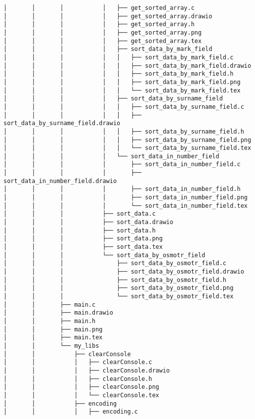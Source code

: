 \begin{verbatim}
│       │       │           │   ├── get_sorted_array.c
│       │       │           │   ├── get_sorted_array.drawio
│       │       │           │   ├── get_sorted_array.h
│       │       │           │   ├── get_sorted_array.png
│       │       │           │   ├── get_sorted_array.tex
│       │       │           │   ├── sort_data_by_mark_field
│       │       │           │   │   ├── sort_data_by_mark_field.c
│       │       │           │   │   ├── sort_data_by_mark_field.drawio
│       │       │           │   │   ├── sort_data_by_mark_field.h
│       │       │           │   │   ├── sort_data_by_mark_field.png
│       │       │           │   │   └── sort_data_by_mark_field.tex
│       │       │           │   ├── sort_data_by_surname_field
│       │       │           │   │   ├── sort_data_by_surname_field.c
│       │       │           │   │   ├── sort_data_by_surname_field.drawio
│       │       │           │   │   ├── sort_data_by_surname_field.h
│       │       │           │   │   ├── sort_data_by_surname_field.png
│       │       │           │   │   └── sort_data_by_surname_field.tex
│       │       │           │   └── sort_data_in_number_field
│       │       │           │       ├── sort_data_in_number_field.c
│       │       │           │       ├── sort_data_in_number_field.drawio
│       │       │           │       ├── sort_data_in_number_field.h
│       │       │           │       ├── sort_data_in_number_field.png
│       │       │           │       └── sort_data_in_number_field.tex
│       │       │           ├── sort_data.c
│       │       │           ├── sort_data.drawio
│       │       │           ├── sort_data.h
│       │       │           ├── sort_data.png
│       │       │           ├── sort_data.tex
│       │       │           └── sort_data_by_osmotr_field
│       │       │               ├── sort_data_by_osmotr_field.c
│       │       │               ├── sort_data_by_osmotr_field.drawio
│       │       │               ├── sort_data_by_osmotr_field.h
│       │       │               ├── sort_data_by_osmotr_field.png
│       │       │               └── sort_data_by_osmotr_field.tex
│       │       ├── main.c
│       │       ├── main.drawio
│       │       ├── main.h
│       │       ├── main.png
│       │       ├── main.tex
│       │       └── my_libs
│       │           ├── clearConsole
│       │           │   ├── clearConsole.c
│       │           │   ├── clearConsole.drawio
│       │           │   ├── clearConsole.h
│       │           │   ├── clearConsole.png
│       │           │   └── clearConsole.tex
│       │           ├── encoding
│       │           │   ├── encoding.c

\end{verbatim}
